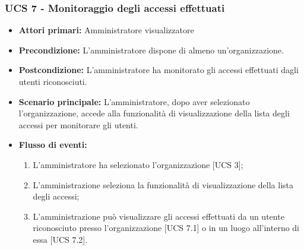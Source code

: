\subsubsection{UCS 7 - Monitoraggio degli accessi effettuati}

\begin{itemize}
\item \textbf{Attori primari:} Amministratore visualizzatore
\item \textbf{Precondizione:} L'amministratore dispone di almeno un'organizzazione.
\item \textbf{Postcondizione:} L'amministratore ha monitorato gli accessi effettuati dagli utenti riconosciuti.
\item \textbf{Scenario principale:} L'amministratore, dopo aver selezionato l'organizzazione, accede alla funzionalità di visualizzazione della lista degli accessi per monitorare gli utenti.
\item \textbf{Flusso di eventi:} 
\begin{enumerate}
	\item L'amministratore ha selezionato l'organizzazione [UCS 3];
	\item L'amministrazione seleziona la funzionalità di visualizzazione della lista degli accessi;
	\item L'amministrazione può visualizzare gli accessi effettuati da un utente riconosciuto presso l'organizzazione [UCS 7.1] o in un luogo all'interno di essa [UCS 7.2].
\end{enumerate}
\end{itemize}

